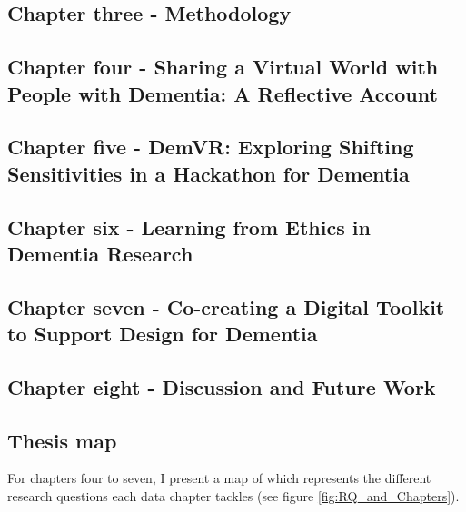 \subsection{Chapter three - Methodology}
\label{Intro:ChapterThree}

\subsection{Chapter four - Sharing a Virtual World with People with Dementia: A Reflective Account}
\label{Intro:ChapterFour}

\subsection{Chapter five - DemVR: Exploring Shifting Sensitivities in a Hackathon for Dementia}
\label{Intro:ChapterFive}

\subsection{Chapter six - Learning from Ethics in Dementia Research}
\label{Intro:ChapterSix}

\subsection{Chapter seven - Co-creating a Digital Toolkit to Support Design for Dementia}
\label{Intro:ChapterSeven}

\subsection{Chapter eight - Discussion and Future Work}
\label{Intro:ChapterEight}


\subsection{Thesis map}
For chapters four to seven, I present a map of which represents the different research questions each data chapter tackles (see figure \ref{fig:RQ_and_Chapters}).

